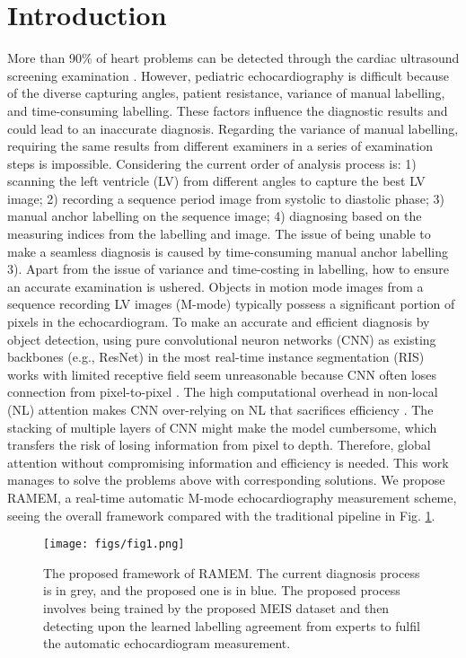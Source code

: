 \documentclass{article}
\begin{document}
\section{Introduction}
\label{sec1}
More than 90\% of heart problems can be detected through the cardiac ultrasound screening examination \cite{otto2013textbook}. However, pediatric echocardiography is difficult because of the diverse capturing angles, patient resistance, variance of manual labelling, and time-consuming labelling. These factors influence the diagnostic results and could lead to an inaccurate diagnosis. Regarding the variance of manual labelling, requiring the same results from different examiners in a series of examination steps is impossible. Considering the current order of analysis process is: 1) scanning the left ventricle (LV) from different angles to capture the best LV image; 2) recording a sequence period image from systolic to diastolic phase; 3) manual anchor labelling on the sequence image; 4) diagnosing based on the measuring indices from the labelling and image. The issue of being unable to make a seamless diagnosis is caused by time-consuming manual anchor labelling 3). Apart from the issue of variance and time-costing in labelling, how to ensure an accurate examination is ushered. Objects in motion mode images from a sequence recording LV images (M-mode) typically possess a significant portion of pixels in the echocardiogram. To make an accurate and efficient diagnosis by object detection, using pure convolutional neuron networks (CNN) as existing backbones (e.g., ResNet) in the most real-time instance segmentation (RIS) works with limited receptive field seem unreasonable because CNN often loses connection from pixel-to-pixel \cite{guo2022beyond}. The high computational overhead in non-local (NL) attention \cite{wang2018non} makes CNN over-relying on NL that sacrifices efficiency \cite{cao2019gcnet}. The stacking of multiple layers of CNN might make the model cumbersome, which transfers the risk of losing information from pixel to depth. Therefore, global attention without compromising information and efficiency is needed. This work manages to solve the problems above with corresponding solutions. We propose RAMEM, a real-time automatic M-mode echocardiography measurement scheme, seeing the overall framework compared with the traditional pipeline in Fig. \ref{fig1}. 

\begin{figure}[!t]
    \centering
    \texttt{[image: figs/fig1.png]}
    \caption{The proposed framework of RAMEM. The current diagnosis process is in grey, and the proposed one is in blue. The proposed process involves being trained by the proposed MEIS dataset and then detecting upon the learned labelling agreement from experts to fulfil the automatic echocardiogram measurement.}
    \label{fig1}
\end{figure}
\end{document}
